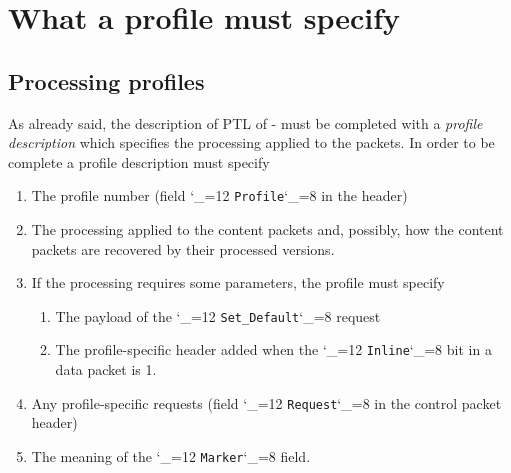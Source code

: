 \documentclass{rfc}
\def\ttt{\catcode`\_=12 \tttii}
\def\tttii#1!{{\tt #1}\catcode`\_=8{}}
\begin{document}

\section{What a profile must specify}
\label{subsub:0.0.4;driver}

\subsection{Processing profiles}
\label{sub:0.0.4.0;transport_layer}

As already said, the description of PTL of \ppetp- must be completed
with a \emph{profile description} which specifies the processing
applied to the packets.  In order to be complete a profile description
must specify

\begin{enumerate}
\item
The profile number (field \ttt Profile! in the header)
\item
The processing applied to the content packets and, possibly, how the
content packets are recovered by their processed versions.
\item
If the processing requires some parameters, the profile must specify
\begin{enumerate}
  \item The payload of the \ttt Set_Default! request
  \item The profile-specific header added when the \ttt Inline! bit in
  a data packet is 1.
\end{enumerate}
\item
Any profile-specific requests (field  \ttt Request! in the control
packet header)
\item
The meaning of the \ttt Marker! field.
\end{enumerate}
%
\end{document}

